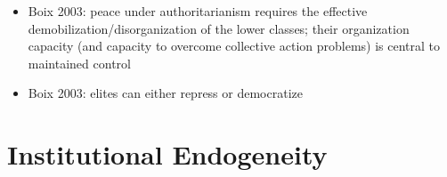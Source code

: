 \documentclass[12pt]{article}
\begin{document}
\begin{itemize}
    \begin{itemize}
        \item If an authoritarian nation is endowed with significant natural resourcs, we would expect greater legislative homogeneity, as there is less of a need for the government to coopt citizen groups to extract wealth
    \end{itemize}
    \item Boix 2003: peace under authoritarianism requires the effective demobilization/disorganization of the lower classes; their organization capacity (and capacity to overcome collective action problems) is central to maintained control
    \item Boix 2003: elites can either repress or democratize
\end{itemize}



\section*{Institutional Endogeneity}
\end{document}
